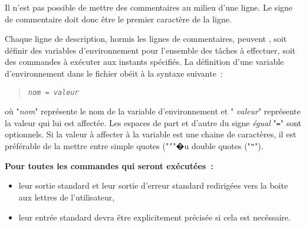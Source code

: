 \begin{remarque}
Il n'est pas possible de mettre des commentaires au milieu d'une ligne. Le signe de
commentaire doit donc {\^e}tre le premier caract{\`e}re de la ligne.
\end{remarque}

Chaque ligne de description, hormis les lignes de commentaires, peuvent , soit
d{\'e}finir des variables d'environnement pour l'ensemble des t{\^a}ches {\`a} effectuer,
soit des commandes {\`a} ex{\'e}cuter aux instants sp{\'e}cifi{\'e}s. La d{\'e}finition d'une
variable d'environnement dans le fichier ob{\'e}it {\`a} la syntaxe suivante~:
\begin{quote}
{\tt {\sl nom} = {\sl valeur}}
\end{quote}
o{\`u} "{\sl nom}" repr{\'e}sente le nom de la variable d'environnement et "{\sl
valeur}" repr{\'e}sente la valeur qui lui est affect{\'e}e. Les espaces de part et
d'autre du signe {\sl {\'e}gual} "{\tt =}" sont optionnels. Si la valeur {\`a}
affecter {\`a} la variable est une chaine de caract{\`e}res, il est pr{\'e}f{\'e}rable de la
mettre entre simple quotes ("{\tt '}"�u double quotes ("\verb="=").

{\bf Pour toutes les commandes qui seront ex{\'e}cut{\'e}es~:
\begin{itemize}
	\item	leur sortie standard et leur sortie d'erreur standard redirig{\'e}es vers
			la boite aux lettres de l'utilisateur,
	\item	leur entr{\'e}e standard devra {\^e}tre explicitement pr{\'e}cis{\'e}e si cela est
			nec{\'e}ssaire.
\end{itemize}
}

